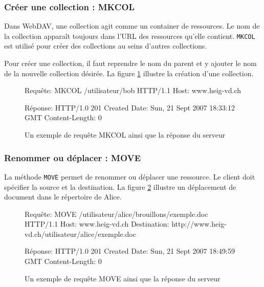 \documentclass[a4paper, 11pt]{article}
\begin{document}
{			\subsubsection{Créer une collection : MKCOL}
			
				Dans WebDAV, une collection agit comme un container de ressources. Le nom de la collection apparaît toujours dans l'URL des ressources qu'elle contient. \texttt{MKCOL} est utilisé pour créer des collections au seins d'autres collections. 
				
				Pour créer une collection, il faut reprendre le nom du parent et y ajouter le nom de la nouvelle collection désirée. La figure \ref{fig:mkcol} illustre la création d'une collection.
				
				\begin{figure}[ht]
				\begin{center}
				\begin{boxedverbatim}
					Requête:
					MKCOL /utilisateur/bob HTTP/1.1
					Host: www.heig-vd.ch

					Réponse: 
					HTTP/1.0 201 Created
					Date: Sun, 21 Sept 2007 18:33:12 GMT
					Content-Length: 0
				\end{boxedverbatim}
				\caption{Un exemple de requête MKCOL ainsi que la réponse du serveur}
				\label{fig:mkcol}
				\end{center}
				\end{figure}
				
			\subsubsection{Renommer ou déplacer : MOVE}
			
				La méthode \texttt{MOVE} permet de renommer ou déplacer une ressource. Le client doit spécifier la source et la destination. La figure \ref{fig:move} illustre un déplacement de document dans le répertoire de Alice. 
				
					\begin{figure}[ht]
					\begin{center}
					\begin{boxedverbatim}
						Requête:
						MOVE /utilisateur/alice/brouillons/exemple.doc HTTP/1.1
						Host: www.heig-vd.ch
						Destination: http://www.heig-vd.ch/utilisateur/alice/exemple.doc

						Réponse: 
						HTTP/1.0 201 Created
						Date: Sun, 21 Sept 2007 18:49:59 GMT
						Content-Length: 0
					\end{boxedverbatim}
					\caption{Un exemple de requête MOVE ainsi que la réponse du serveur}
					\label{fig:move}
					\end{center}
					\end{figure}
					
}
\end{document}
